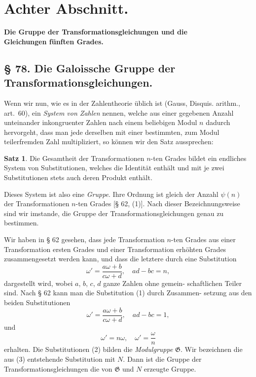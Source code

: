 \documentclass[12pt,a4paper]{article}
\theoremstyle{definition}
\newtheorem*{satz}{Satz}
\begin{document}
\newpage
\section*{Achter Abschnitt.}
\begin{center}
\textbf{Die Gruppe der Transformationsgleichungen und die}\\
\textbf{Gleichungen f\"unften Grades.}
\end{center}

\subsection*{\S{} 78. Die Galoissche Gruppe der Transformationsgleichungen.}

Wenn wir nun, wie es in der Zahlentheorie \"ublich ist (Gauss, Disquis.
arithm., art.~60), ein \textit{System von Zahlen} nennen, welche aus
einer gegebenen Anzahl unteinander inkongruenter Zahlen nach
einem beliebigen Modul $n$ dadurch hervorgeht, dass man jede
derselben mit einer bestimmten, zum Modul teilerfremden Zahl
multipliziert, so k\"onnen wir den Satz aussprechen:

\begin{satz}
Die Gesamtheit der Transformationen $n$-ten Grades bildet ein
endliches System von Substitutionen, welches die Identit\"at enth\"alt
und mit je zwei Substitutionen stets auch deren Produkt enth\"alt.
\end{satz}

Dieses System ist also eine \textit{Gruppe}. Ihre Ordnung ist gleich
der Anzahl $\psi(n)$ der Transformationen $n$-ten Grades [\S{} 62, (1)].
Nach dieser Bezeichnungsweise sind wir imstande, die Gruppe
der Transformationsgleichungen genau zu bestimmen.

Wir haben in \S{} 62 gesehen, dass jede Transformation $n$-ten
Grades aus einer Transformation ersten Grades und einer Transformation
erh\"ohten Grades zusammengesetzt werden kann, und dass die letztere
durch eine Substitution
\begin{equation}\tag{1}
\omega' = \frac{a\omega + b}{c\omega + d}, \quad ad - bc = n,
\end{equation}
dargestellt wird, wobei $a$, $b$, $c$, $d$ ganze Zahlen ohne gemein-
schaftlichen Teiler sind.
Nach \S{} 62 kann man die Substitution (1) durch Zusammen-
setzung aus den beiden Substitutionen
\begin{equation}\tag{2}
\omega' = \frac{a\omega + b}{c\omega + d}, \quad ad - bc = 1,
\end{equation}
und
\begin{equation}\tag{3}
\omega' = n\omega, \quad \omega' = \frac{\omega}{n}
\end{equation}
erhalten. Die Substitutionen (2) bilden die \textit{Modulgruppe} $\mathfrak{G}$.
Wir bezeichnen die aus (3) entstehende Substitution mit $N$.
Dann ist die Gruppe der Transformationsgleichungen die von
$\mathfrak{G}$ und $N$ erzeugte Gruppe.
\end{document}
